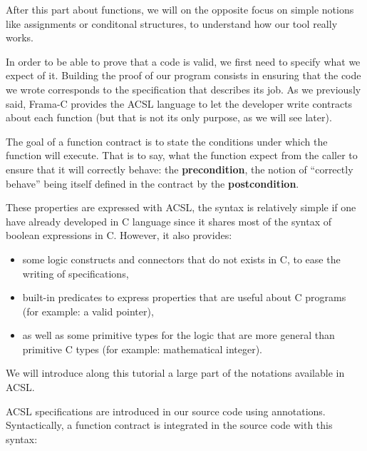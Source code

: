 \documentclass[middle]{zmdocument}
\begin{document}
After this part about functions, we will on the opposite focus on simple
notions like assignments or conditonal structures, to understand how our
tool really works.



In order to be able to prove that a code is valid, we first need to
specify what we expect of it. Building the proof of our program consists
in ensuring that the code we wrote corresponds to the specification that
describes its job. As we previously said, Frama-C provides the ACSL
language to let the developer write contracts about each function (but
that is not its only purpose, as we will see later).





The goal of a function contract is to state the conditions under which
the function will execute. That is to say, what the function expect from
the caller to ensure that it will correctly behave: the \textbf{precondition},
the notion of ``correctly behave'' being itself defined in the contract
by the \textbf{postcondition}.



These properties are expressed with ACSL, the syntax is relatively
simple if one have already developed in C language since it shares most
of the syntax of boolean expressions in C. However, it also provides:



\begin{itemize}
\item
  some logic constructs and connectors that do not exists in C, to ease
  the writing of specifications,
\item
  built-in predicates to express properties that are useful about C
  programs (for example: a valid pointer),
\item
  as well as some primitive types for the logic that are more general
  than primitive C types (for example: mathematical integer).
\end{itemize}



We will introduce along this tutorial a large part of the notations
available in ACSL.



ACSL specifications are introduced in our source code using annotations.
Syntactically, a function contract is integrated in the source code with
this syntax:
\end{document}
